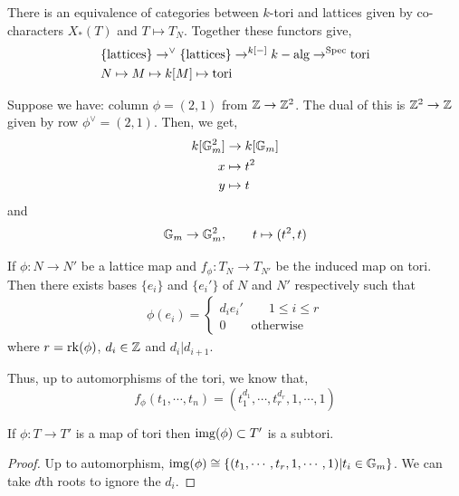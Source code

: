 \documentclass[12pt]{amsart}
\begin{document}
\begin{theorem}
    There is an equivalence of categories between $k$-tori and lattices given by co-characters $X_*(T)$ and $T \mapsto T_N$. Together these functors give, 
    \begin{align*}
        &\{\text{lattices}\} \to^\vee \{\text{lattices}\} \to^{k[-]} k-\text{alg} \to^{\operatorname{Spec}} \text{tori} \\
        &N \mapsto M \mapsto k[M] \mapsto \text{tori}
    \end{align*}
\end{theorem}

\begin{example}
    Suppose we have: column $\phi = (2,1)$ from $\mathbb Z \to \mathbb Z^2$. The dual of this is $\mathbb Z^2 \to \mathbb Z$ given by row $\phi^\vee = (2, 1)$. Then, we get, 
    \begin{align*}
        k[\mathbb G_m^2] &\to k[\mathbb G_m] \\
        x &\mapsto t^2 \\
        y &\mapsto t
    \end{align*}
    and 
    \[ \mathbb G_m \to \mathbb G_m^2, \qquad t \mapsto (t^2, t) \]
\end{example}

\begin{proposition}
    If $\phi: N \to N'$ be a lattice map and $f_\phi: T_N \to T_{N'}$ be the induced map on tori. Then there exists bases $\{e_i\}$ and $\{e_i'\}$ of $N$ and $N'$ respectively such that 
    \begin{align*}
        \phi(e_i) = \begin{cases}
            d_ie_i' \qquad 1 \leq i \leq r \\
            0 \qquad \text{otherwise}
        \end{cases}
    \end{align*}
    where $r = \operatorname{rk}(\phi)$, $d_i \in \mathbb Z$ and $d_i | d_{i+1}$. 

    Thus, up to automorphisms of the tori, we know that, 
    \[ f_\phi(t_1, \cdots, t_n) = (t_1^{d_1}, \cdots, t_r^{d_r}, 1, \cdots, 1)\]
\end{proposition}

\begin{corollary}
    If $\phi: T \to T'$ is a map of tori then $\operatorname{img}(\phi) \subset T'$ is a subtori. 
\end{corollary}

\begin{proof}
    Up to automorphism, $\operatorname{img}(\phi) \cong \{(t_1, \cdots, t_r, 1, \cdots, 1) | t_i \in \mathbb G_m\}$. We can take $d$th roots to ignore the $d_i$. 
\end{proof}
\end{document}
